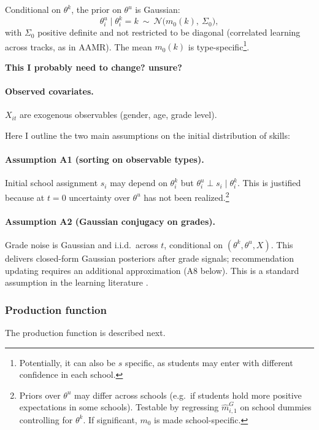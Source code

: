 \documentclass{article}
\begin{document}
Conditional on $\theta^k$, the prior on $\theta^u$ is Gaussian:
\begin{equation}
  \theta^u_i \mid \theta^k_i = k \ \sim\ \mathcal{N}\big(m_0(k),\ \Sigma_0\big),
  \label{eq:prior_thetau}
\end{equation}
with $\Sigma_0$ positive definite and not restricted to be diagonal (correlated learning across tracks, as in AAMR). The mean $m_0(k)$ is type-specific\footnote{Potentially, it can also be $s$ specific, as students may enter with different confidence in each school.}.

\textbf{This I probably need to change? unsure?}

\paragraph{Observed covariates.} $X_{it}$ are exogenous observables (gender, age, grade level).

\vspace{1em}


Here I outline the two main assumptions on the initial distribution of skills:

\paragraph{Assumption A1 (sorting on observable types).} Initial school assignment $s_i$ may depend on $\theta^k_i$ but $\theta^u_i \perp s_i \mid \theta^k_i$. This is justified because at $t=0$ uncertainty over $\theta^u$ has not been realized.\footnote{Priors over $\theta^u$ may differ across schools (e.g.\ if students hold more positive expectations in some schools). Testable by regressing $\hat m^G_{i,1}$ on school dummies controlling for $\theta^k$. If significant, $m_0$ is made school-specific.}

\paragraph{Assumption A2 (Gaussian conjugacy on grades).} Grade noise is Gaussian and i.i.d.\ across $t$, conditional on $(\theta^k, \theta^u, X)$. This delivers closed-form Gaussian posteriors after grade signals; recommendation updating requires an additional approximation (A8 below). This is a standard assumption in the learning literature \citep{bunting2024heterogeneity}.


\subsubsection{Production function}
The production function is described next.
\end{document}
